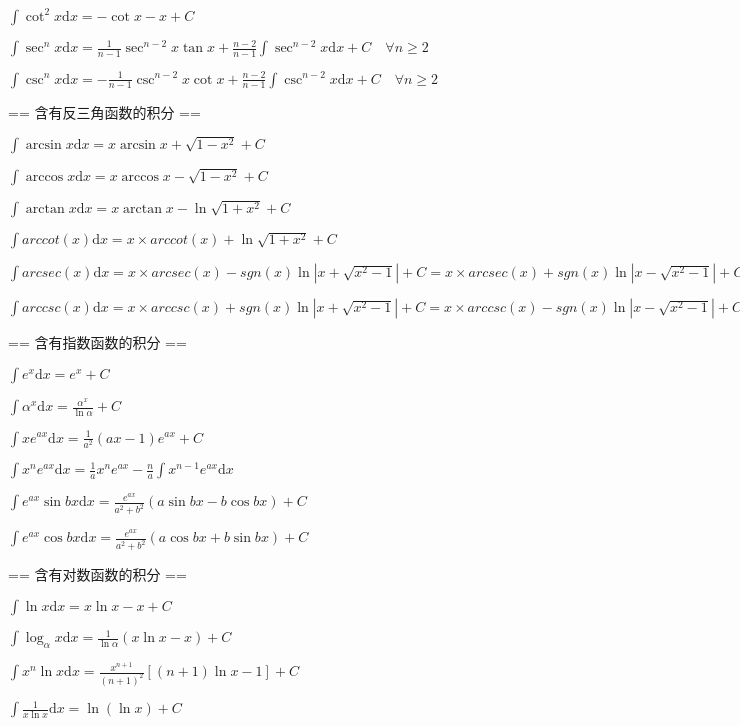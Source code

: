 $\int \cot ^2 x \mbox{d}x = - \cot x - x +C$\par
$\int \sec ^n x \mbox{d}x = \frac{1}{n-1} \sec ^{n-2} x \tan x + \frac{n-2}{n-1} \int \sec ^{n-2} x \mbox{d}x +C \quad \forall n \ge 2$\par
$\int \csc ^n x \mbox{d}x = - \frac{1}{n-1} \csc ^{n-2} x \cot x + \frac{n-2}{n-1} \int \csc ^{n-2} x \mbox{d}x +C \quad \forall n \ge 2$\par
== 含有反三角函数的积分 ==\par
$\int \arcsin x \mbox{d}x = x \arcsin x + \sqrt {1 - x^2} +C$\par
$\int \arccos x \mbox{d}x = x \arccos x - \sqrt {1 - x^2} +C$\par
$\int \arctan x \mbox{d}x = x \arctan x - \ln \sqrt {1 + x^2} +C$\par
$\int arccot(x) \mbox{d}x = x\times  arccot (x) + \ln \sqrt {1 + x^2} +C$\par
$\int arcsec(x) \mbox{d}x = x\times arcsec (x) - sgn(x)\ln \left|x + \sqrt{x^2 - 1}\right| +C
                              = x\times  arcsec(x) + sgn(x)\ln \left|x - \sqrt{x^2 - 1}\right| +C$\par
$\int arccsc (x) \mbox{d}x = x\times  arccsc(x) + sgn(x)\ln \left|x + \sqrt{x^2 - 1}\right| +C
                               = x\times  arccsc (x) - sgn(x)\ln \left|x - \sqrt{x^2 - 1}\right| +C$\par
== 含有指数函数的积分 ==\par
$\int e^x\mbox{d}x=e^x+C$\par
$\int\alpha^x\mbox{d}x=\frac{\alpha^x}{\ln\alpha}+C$\par
$\int xe^{ax}\mbox{d}x=\frac{1}{a^2}(ax-1)e^{ax}+C$\par
$\int x^ne^{ax}\mbox{d}x=\frac{1}{a}x^ne^{ax}-\frac{n}{a}\int x^{n-1}e^{ax}\mbox{d}x$\par
$\int e^{ax}\sin bx \mbox{d}x=\frac{e^{ax}}{a^2+b^2}(a\sin bx-b\cos bx)+C$\par
$\int e^{ax}\cos bx \mbox{d}x=\frac{e^{ax}}{a^2+b^2}(a\cos bx+b\sin bx)+C$\par
== 含有对数函数的积分 ==\par
$\int\ln x\mbox{d}x = x\ln x - x + C$\par
$\int\log_\alpha x\mbox{d}x=\frac{1}{\ln\alpha}\left({x\ln x - x}\right)+C$\par
$\int x^n\ln x\mbox{d}x = \frac{x^{n+1}}{(n+1)^2}[(n+1)\ln x -1]+ C$\par
$\int\frac{1}{x\ln{x}}\mbox{d}x = \ln{(\ln{x})}+C$\par
